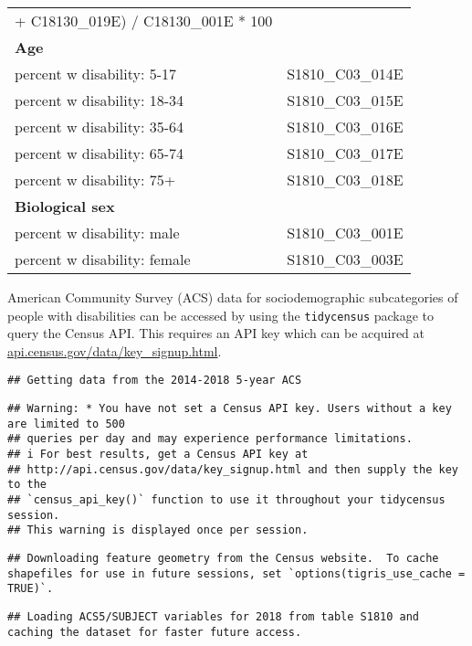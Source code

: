 \documentclass[
]{article}
\begin{document}
\begin{longtable}[]{@{}
  >{\centering\arraybackslash}p{}
  >{\centering\arraybackslash}p{}@{}}
+ C18130\_019E) / C18130\_001E * 100 \\
\textbf{Age} & \\
percent w disability: 5-17 & S1810\_C03\_014E \\
percent w disability: 18-34 & S1810\_C03\_015E \\
percent w disability: 35-64 & S1810\_C03\_016E \\
percent w disability: 65-74 & S1810\_C03\_017E \\
percent w disability: 75+ & S1810\_C03\_018E \\
\textbf{Biological sex} & \\
percent w disability: male & S1810\_C03\_001E \\
percent w disability: female & S1810\_C03\_003E \\
\end{longtable}

American Community Survey (ACS) data for sociodemographic subcategories
of people with disabilities can be accessed by using the
\texttt{tidycensus} package to query the Census API. This requires an
API key which can be acquired at
\href{https://api.census.gov/data/key_signup.html}{api.census.gov/data/key\_signup.html}.

\begin{verbatim}
## Getting data from the 2014-2018 5-year ACS
\end{verbatim}

\begin{verbatim}
## Warning: * You have not set a Census API key. Users without a key are limited to 500
## queries per day and may experience performance limitations.
## i For best results, get a Census API key at
## http://api.census.gov/data/key_signup.html and then supply the key to the
## `census_api_key()` function to use it throughout your tidycensus session.
## This warning is displayed once per session.
\end{verbatim}

\begin{verbatim}
## Downloading feature geometry from the Census website.  To cache shapefiles for use in future sessions, set `options(tigris_use_cache = TRUE)`.
\end{verbatim}

\begin{verbatim}
## Loading ACS5/SUBJECT variables for 2018 from table S1810 and caching the dataset for faster future access.
\end{verbatim}
\end{document}
